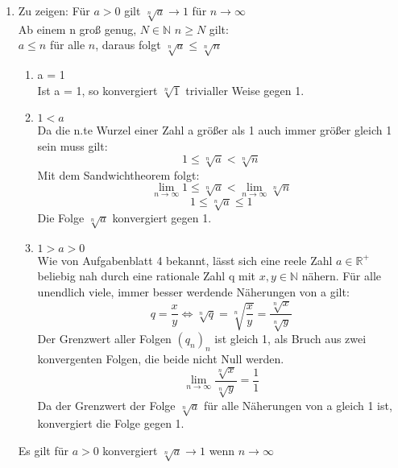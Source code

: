 \documentclass{article}
\begin{document}
\begin{enumerate}[ label = (\alph*)]
        \item Zu zeigen: Für \(a > 0\) gilt \( \sqrt[n]{a} \to 1 \) für \( n \to \infty \) \\
        Ab einem n groß genug, \(N \in \mathbb{N}\) \(n \geq N\) gilt: \\
        \(a \leq n\) für alle \(n\), daraus folgt \(\sqrt[n]{a} \leq \sqrt[n]{n}\) \\
        \begin{enumerate}[ label = \arabic*. Fall ]
            \item a = 1 \\
            Ist a = 1, so konvergiert \(\sqrt[n]{1}\) trivialler Weise gegen 1.
            
            \item \(1 < a\) \\
            Da die n.te Wurzel einer Zahl a größer als 1 auch immer größer gleich 1 sein muss gilt:
            \[1 \leq \sqrt[n]{a} < \sqrt[n]{n} \]
            Mit dem Sandwichtheorem folgt:
            \[\lim_{n \to \infty} 1 \leq \sqrt[n]{a} < \lim_{n \to \infty} \sqrt[n]{n} \]
            \[1 \leq \sqrt[n]{a} \leq 1\]
            Die Folge \(\sqrt[n]{a}\) konvergiert gegen 1.
    
            \item \(1 > a > 0 \) \\
            Wie von Aufgabenblatt 4 bekannt, lässt sich eine reele Zahl \(a \in \mathbb{R}^+\) beliebig nah
            durch eine rationale Zahl q mit \(x, y \in \mathbb{N} \) nähern.
            Für alle unendlich viele, immer besser werdende Näherungen von a gilt:
            \[q = \frac{x}{y} \Leftrightarrow \sqrt[n]{q} = \sqrt[n]{\frac{x}{y}} = \frac{\sqrt[n]{x}}{\sqrt[n]{y}}\]
            Der Grenzwert aller Folgen \({(q_n)_n}\) ist gleich 1, als Bruch aus zwei konvergenten Folgen, die beide nicht Null werden.
            \[\lim_{n \to \infty} \frac{\sqrt[n]{x}}{\sqrt[n]{y}} = \frac{1}{1} \]
            Da der Grenzwert der Folge \(\sqrt[n]{a}\) für alle Näherungen von a gleich 1 ist, konvergiert die Folge gegen 1.
        \end{enumerate}
    
        Es gilt für \(a > 0\) konvergiert \(\sqrt[n]{a} \to 1\) wenn \(n \to \infty\) \\
    \end{enumerate}
\end{document}
